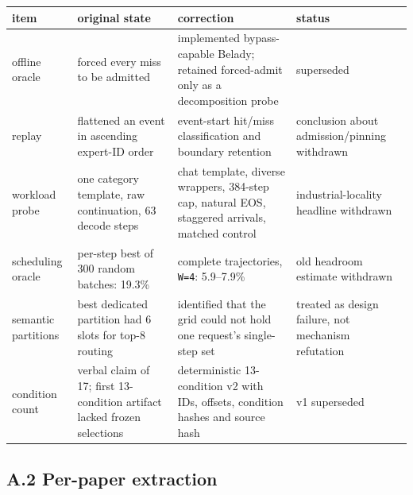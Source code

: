 \documentclass[
  10pt,
  letterpaper,
  10pt]{article}
\newcounter{none} %
\begin{document}
{\def\LTcaptype{none} %
\begin{longtable}[]{@{}
  >{\raggedright\arraybackslash}p{}
  >{\raggedright\arraybackslash}p{}
  >{\raggedright\arraybackslash}p{}
  >{\raggedright\arraybackslash}p{}@{}}
\toprule\noalign{}
\begin{minipage}[b]{\linewidth}\raggedright
item
\end{minipage} & \begin{minipage}[b]{\linewidth}\raggedright
original state
\end{minipage} & \begin{minipage}[b]{\linewidth}\raggedright
correction
\end{minipage} & \begin{minipage}[b]{\linewidth}\raggedright
status
\end{minipage} \\
\midrule\noalign{}
\endhead
\bottomrule\noalign{}
\endlastfoot
offline oracle & forced every miss to be admitted & implemented
bypass-capable Belady; retained forced-admit only as a decomposition
probe & superseded \\
replay & flattened an event in ascending expert-ID order & event-start
hit/miss classification and boundary retention & conclusion about
admission/pinning withdrawn \\
workload probe & one category template, raw continuation, 63 decode
steps & chat template, diverse wrappers, 384-step cap, natural EOS,
staggered arrivals, matched control & industrial-locality headline
withdrawn \\
scheduling oracle & per-step best of 300 random batches: 19.3\% &
complete trajectories, \texttt{W=4}: 5.9--7.9\% & old headroom estimate
withdrawn \\
semantic partitions & best dedicated partition had 6 slots for top-8
routing & identified that the grid could not hold one request's
single-step set & treated as design failure, not mechanism refutation \\
condition count & verbal claim of 17; first 13-condition artifact lacked
frozen selections & deterministic 13-condition v2 with IDs, offsets,
condition hashes and source hash & v1 superseded \\
\end{longtable}
}

\subsection{A.2 Per-paper extraction}\label{a.2-per-paper-extraction}
\end{document}
